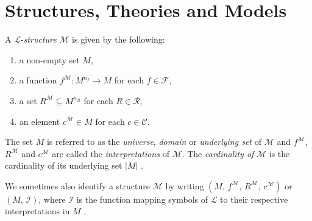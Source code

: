 \documentclass[../../main.tex]{subfiles}
\begin{document}
\section{Structures, Theories and Models}
\begin{definition}\label{structure-def}
    A $\mathcal{L}$-\textit{structure} $\mathcal{M}$ is given by the following:
    \begin{enumerate}
        \item a non-empty set $M$,
        \item a function $f^{\mathcal{M}}: M^{n_f} \to M$ for each $f \in \mathcal{F}$,
        \item a set $R^\mathcal{M} \subseteq M^{n_R}$ for each $R \in \mathcal{R}$,
        \item an element $c^\mathcal{M} \in M$ for each $c \in \mathcal{C}$.
    \end{enumerate}
    The set $M$ is referred to as the \textit{universe}, \textit{domain} or \textit{underlying set} of $\mathcal{M}$ 
    and $f^{\mathcal{M}}$, $R^{\mathcal{M}}$ and $c^{\mathcal{M}}$ are called the \textit{interpretations} of $\mathcal{M}$. 
    The \textit{cardinality of} $\mathcal{M}$ is the cardinality of its underlying set $\left\lvert M\right\rvert$ \cite[Definition 1.1.2]{Mar02}.

    We sometimes also identify a structure $\mathcal{M}$ by writing $\left(M,\, f^{\mathcal{M}},\, R^{\mathcal{M}},\, c^{\mathcal{M}}\right)$ \cite{Mar02} or $\left(M,\, \mathcal{I}\right)$, 
    where $\mathcal{I}$ is the function mapping symbols of $\mathcal{L}$ to their respective interpretations in $M$ \cite[p.20]{Cha90}.
\end{definition}
\end{document}
